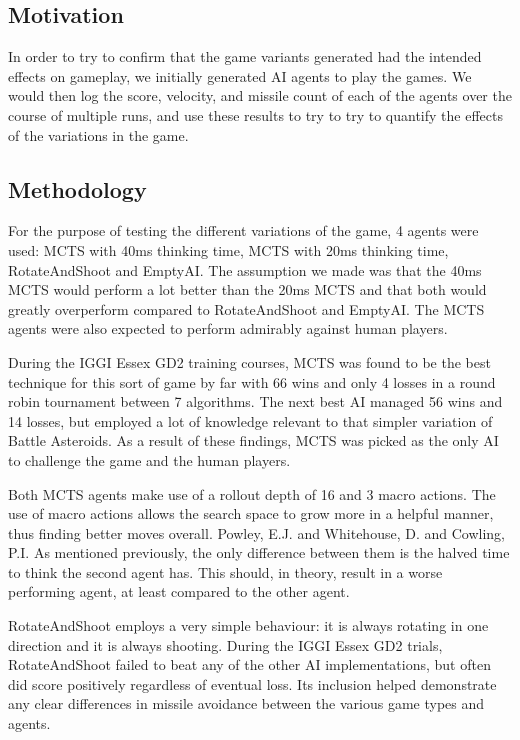 \subsection{Motivation}
In order to try to confirm that the game variants generated had the intended effects on gameplay, we initially generated AI agents to play the games. We would then log the score, velocity, and missile count of each of the agents over the course of multiple runs, and use these results to try to try to quantify the effects of the variations in the game.

\subsection{Methodology}


For the purpose of testing the different variations of the game, 4 agents were used: MCTS with 40ms thinking time, MCTS with 20ms thinking time, RotateAndShoot and EmptyAI.
The assumption we made was that the 40ms MCTS would perform a lot better than the 20ms MCTS and that both would greatly overperform compared to RotateAndShoot and EmptyAI. The MCTS agents were also expected to perform admirably against human players.

During the IGGI Essex GD2 training courses, MCTS was found to be the best technique for this sort of game by far with 66 wins and only 4 losses in a round robin tournament between 7 algorithms. The next best AI managed 56 wins and 14 losses, but employed a lot of knowledge relevant to that simpler variation of Battle Asteroids. As a result of these findings, MCTS was picked as the only AI to challenge the game and the human players.

Both MCTS agents make use of a rollout depth of 16 and 3 macro actions. The use of macro actions allows the search space to grow more in a helpful manner, thus finding better moves overall. {Powley, E.J. and Whitehouse, D. and Cowling, P.I.} As mentioned previously, the only difference between them is the halved time to think the second agent has. This should, in theory, result in a worse performing agent, at least compared to the other agent.

RotateAndShoot employs a very simple behaviour: it is always rotating in one direction and it is always shooting. During the IGGI Essex GD2 trials, RotateAndShoot failed to beat any of the other AI implementations, but often did score positively regardless of eventual loss. Its inclusion helped demonstrate any clear differences in missile avoidance between the various game types and agents.

